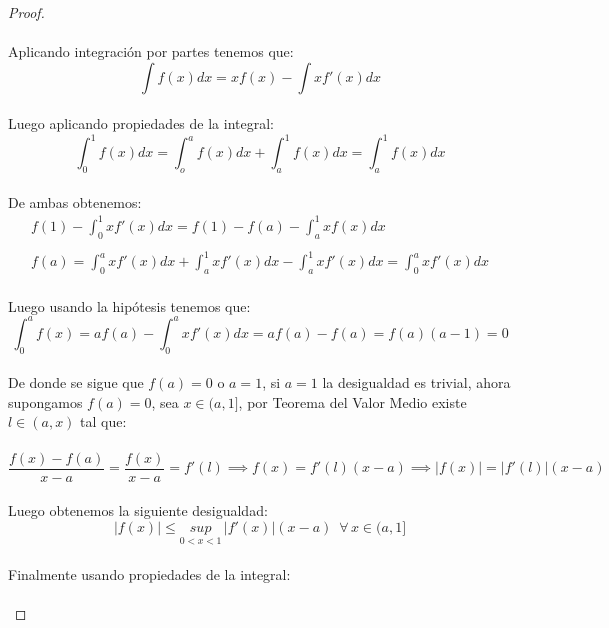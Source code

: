 \documentclass[11pt,letterpaper]{article}
\begin{document}
\begin{proof}\,\\
    \,\\
    Aplicando integraci\'on por partes tenemos que:\,\\
    \begin{equation*}
        \int f(x) dx=xf(x)-\int xf'(x)dx
    \end{equation*}\,\\
    Luego aplicando propiedades de la integral:\,\\
    \begin{equation*}
        \int_{0}^{1}f(x)dx=\int_{o}^a f(x)dx+\int_{a}^{1}f(x)dx=\int_{a}^{1}f(x)dx
    \end{equation*}\,\\
    De ambas obtenemos:\,\\
    \begin{align*}
        f(1)-\int_{0}^{1}xf'(x)dx=f(1)-f(a)-\int_{a}^{1}xf(x)dx\\
        \,\\
        f(a)=\int_{0}^{a}xf'(x)dx+\int_{a}^{1}xf'(x)dx-\int_{a}^{1}xf'(x)dx=\int_{0}^{a}xf'(x)dx
    \end{align*}\,\\
    Luego usando la hip\'otesis tenemos que:\,\\
    \begin{equation*}
        \int_{0}^{a}f(x)=af(a)-\int_{0}^{a}xf'(x)dx=af(a)-f(a)=f(a)(a-1)=0
    \end{equation*}\,\\
    De donde se sigue que $f(a)=0$ o $a=1$, si $a=1$ la desigualdad es trivial, ahora supongamos $f(a)=0$, sea  
    $x\in(a,1]$, por Teorema del Valor Medio existe $l\in(a,x)$ tal que:\,\\
    \,\\
    \begin{equation*}
        \frac{f(x)-f(a)}{x-a}=\frac{f(x)}{x-a}=f'(l)\implies f(x)=f'(l)(x-a) \implies |f(x)|=|f'(l)|(x-a)
    \end{equation*}\,\\
Luego obtenemos la siguiente desigualdad:\,\\
\begin{equation*}
    |f(x)|\leq \underset{0<x<1}{sup}\,|f'(x)| (x-a)\,\,\,\forall\,x\in (a,1]
\end{equation*}\,\\
Finalmente usando propiedades de la integral:\,\\
\,\\

\end{proof}
\end{document}
